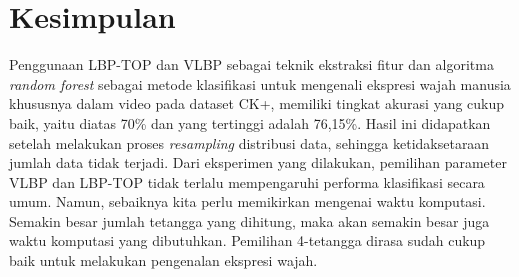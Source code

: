 \documentclass[review,3p,12pt,times]{elsarticle}
\begin{document}

\newpage
\section{Kesimpulan}
\label{conclusion}

Penggunaan LBP-TOP dan VLBP sebagai teknik ekstraksi fitur dan algoritma \textit{random forest} sebagai metode klasifikasi untuk mengenali ekspresi wajah manusia khususnya dalam video pada dataset CK+, memiliki tingkat akurasi yang cukup baik, yaitu diatas 70\% dan yang tertinggi adalah 76,15\%. Hasil ini didapatkan setelah melakukan proses \textit{resampling} distribusi data, sehingga ketidaksetaraan jumlah data tidak terjadi. Dari eksperimen yang dilakukan, pemilihan parameter VLBP dan LBP-TOP tidak terlalu mempengaruhi performa klasifikasi secara umum. Namun, sebaiknya kita perlu memikirkan mengenai waktu komputasi. Semakin besar jumlah tetangga yang dihitung, maka akan semakin besar juga waktu komputasi yang dibutuhkan. Pemilihan 4-tetangga dirasa sudah cukup baik untuk melakukan pengenalan ekspresi wajah.














\end{document}
